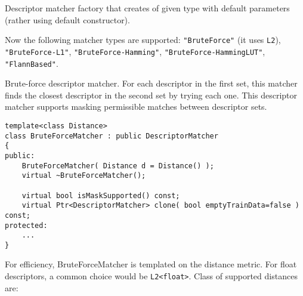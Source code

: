 Descriptor matcher factory that creates  of 
given type with default parameters (rather using default constructor).


\begin{description}
\end{description}
Now the following matcher types are supported: \texttt{"BruteForce"} (it uses \texttt{L2}), \texttt{"BruteForce-L1"}, 
\texttt{"BruteForce-Hamming"}, \texttt{"BruteForce-HammingLUT"}, \texttt{"FlannBased"}.

\label{cv.class.BruteForceMatcher}
Brute-force descriptor matcher. For each descriptor in the first set, this matcher finds the closest
descriptor in the second set by trying each one. This descriptor matcher supports masking 
permissible matches between descriptor sets.

\begin{lstlisting}
template<class Distance>
class BruteForceMatcher : public DescriptorMatcher
{
public:
    BruteForceMatcher( Distance d = Distance() );
    virtual ~BruteForceMatcher();

    virtual bool isMaskSupported() const;
    virtual Ptr<DescriptorMatcher> clone( bool emptyTrainData=false ) const;
protected:
    ...
}
\end{lstlisting}

For efficiency, BruteForceMatcher is templated on the distance metric.
For float descriptors, a common choice would be \texttt{L2<float>}. Class of supported distances are:

